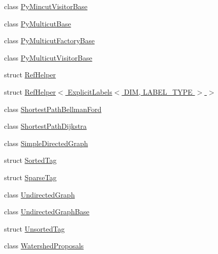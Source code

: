 \begin{DoxyCompactItemize}
\item 
class \hyperlink{classnifty_1_1graph_1_1PyMincutVisitorBase}{Py\+Mincut\+Visitor\+Base}
\item 
class \hyperlink{classnifty_1_1graph_1_1PyMulticutBase}{Py\+Multicut\+Base}
\item 
class \hyperlink{classnifty_1_1graph_1_1PyMulticutFactoryBase}{Py\+Multicut\+Factory\+Base}
\item 
class \hyperlink{classnifty_1_1graph_1_1PyMulticutVisitorBase}{Py\+Multicut\+Visitor\+Base}
\item 
struct \hyperlink{structnifty_1_1graph_1_1RefHelper}{Ref\+Helper}
\item 
struct \hyperlink{structnifty_1_1graph_1_1RefHelper_3_01ExplicitLabels_3_01DIM_00_01LABEL__TYPE_01_4_01_4}{Ref\+Helper$<$ Explicit\+Labels$<$ D\+I\+M, L\+A\+B\+E\+L\+\_\+\+T\+Y\+P\+E $>$ $>$}
\item 
class \hyperlink{classnifty_1_1graph_1_1ShortestPathBellmanFord}{Shortest\+Path\+Bellman\+Ford}
\item 
class \hyperlink{classnifty_1_1graph_1_1ShortestPathDijkstra}{Shortest\+Path\+Dijkstra}
\item 
class \hyperlink{classnifty_1_1graph_1_1SimpleDirectedGraph}{Simple\+Directed\+Graph}
\item 
struct \hyperlink{structnifty_1_1graph_1_1SortedTag}{Sorted\+Tag}
\item 
struct \hyperlink{structnifty_1_1graph_1_1SparseTag}{Sparse\+Tag}
\item 
class \hyperlink{classnifty_1_1graph_1_1UndirectedGraph}{Undirected\+Graph}
\item 
class \hyperlink{classnifty_1_1graph_1_1UndirectedGraphBase}{Undirected\+Graph\+Base}
\item 
struct \hyperlink{structnifty_1_1graph_1_1UnsortedTag}{Unsorted\+Tag}
\item 
class \hyperlink{classnifty_1_1graph_1_1WatershedProposals}{Watershed\+Proposals}
\end{DoxyCompactItemize}

